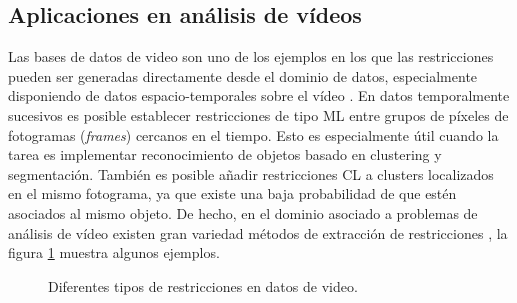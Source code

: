 \subsection{Aplicaciones en análisis de vídeos}

Las bases de datos de video son uno de los ejemplos en los que las restricciones pueden ser generadas directamente desde el dominio de datos, especialmente disponiendo de datos espacio-temporales sobre el vídeo \cite{Yan:2004}. En datos temporalmente sucesivos es posible establecer restricciones de tipo \acf{ML} entre grupos de píxeles de fotogramas (\textit{frames}) cercanos en el tiempo. Esto es especialmente útil cuando la tarea es implementar reconocimiento de objetos basado en clustering y segmentación. También es posible añadir restricciones \acf{CL} a clusters localizados en el mismo fotograma, ya que existe una baja probabilidad de que estén asociados al mismo objeto. De hecho, en el dominio asociado a problemas de análisis de vídeo existen gran variedad métodos de extracción de restricciones \cite{Yan:2004}, la figura \ref{fig:figure12} muestra algunos ejemplos.  

\begin{figure}[bth]
	\myfloatalign
	\quad
	 \quad
	\quad
	\caption{Diferentes tipos de restricciones en datos de video. \cite{Yan:2004} \cite{Survey:2007}}\label{fig:figure12}
\end{figure}

